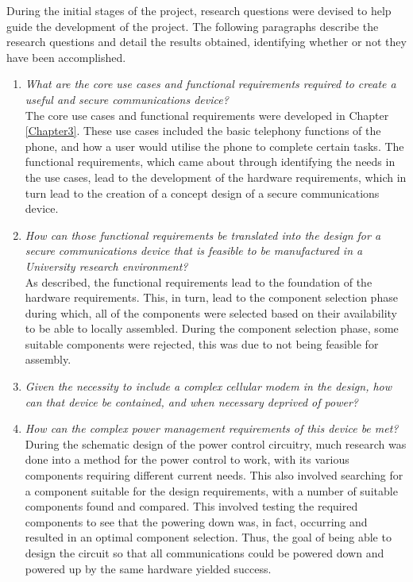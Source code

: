 	During the initial stages of the project, research questions were devised to help guide the development of the project. The following paragraphs describe the research questions and detail the results obtained, identifying whether or not they have been accomplished.\\

\begin{enumerate}
\item \textit{What are the core use cases and functional requirements required to create a useful and secure communications device?}\\

	The core use cases and functional requirements were developed in Chapter \ref{Chapter3}. 
These use cases included the basic telephony functions of the phone, and how a user would utilise the phone to complete certain tasks. 
The functional requirements, which came about through identifying the needs in the use cases, lead to the development of the hardware requirements, which in turn lead to the creation of a concept design of a secure communications device.\\

\item \textit{How can those functional requirements be translated into the design for a secure communications device that is feasible to be manufactured in a University research environment?}\\

	As described, the functional requirements lead to the foundation of the hardware requirements. This, in turn, lead to the component selection phase during which, all of the components were selected based on their availability to be able to locally assembled.
During the component selection phase, some suitable components were rejected, this was due to not being feasible for assembly.\\

\item \textit{Given the necessity to include a complex cellular modem in the design, how can that device be contained, and when necessary deprived of power?}\\

	
	

\item \textit{How can the complex power management requirements of this device be met?}\\

	During the schematic design of the power control circuitry, much research was done into a method for the power control to work, with its various components requiring different current needs. 
This also involved searching for a component suitable for the design requirements, with a number of suitable components found and compared. This involved testing the required components to see that the powering down was, in fact, occurring and resulted in an optimal component selection. Thus, the goal of being able to design the circuit so that all communications could be powered down and powered up by the same hardware yielded success.\\
	

\end{enumerate}

